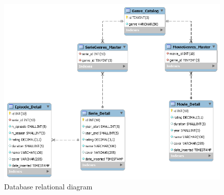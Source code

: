 \documentclass{article}
\begin{document}
	\begin{figure}
		\centering
		\includegraphics[width=0.75\linewidth]{OOPTecDummy-relational-diagram}
		\caption{Database relational diagram}
		\label{fig:relational-diagram}
	\end{figure}
\end{document}
